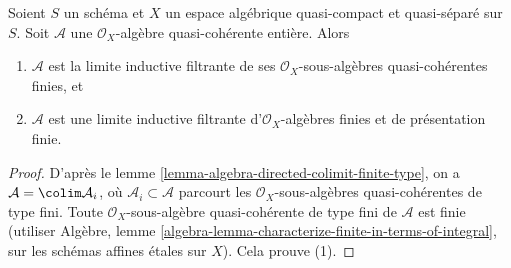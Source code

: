 \begin{lemma}
\label{lemma-integral-algebra-directed-colimit-finite}
Soient $S$ un schéma et $X$ un espace algébrique quasi-compact et quasi-séparé
sur $S$. Soit $\mathcal{A}$ une $\mathcal{O}_X$-algèbre quasi-cohérente
entière. Alors
\begin{enumerate}
\item $\mathcal{A}$ est la limite inductive filtrante de ses
$\mathcal{O}_X$-sous-algèbres quasi-cohérentes finies, et
\item $\mathcal{A}$ est une limite inductive filtrante d'$\mathcal{O}_X$-algèbres
finies et de présentation finie.
\end{enumerate}
\end{lemma}

\begin{proof}
D'après le lemme \ref{lemma-algebra-directed-colimit-finite-type}, on a
$\mathcal{A} = \colim \mathcal{A}_i$, où
$\mathcal{A}_i \subset \mathcal{A}$ parcourt les
$\mathcal{O}_X$-sous-algèbres quasi-cohérentes de type fini.
Toute $\mathcal{O}_X$-sous-algèbre quasi-cohérente de type fini
de $\mathcal{A}$ est finie (utiliser Algèbre, lemme
\ref{algebra-lemma-characterize-finite-in-terms-of-integral},
sur les schémas affines étales sur $X$). Cela prouve (1).


\end{proof}
